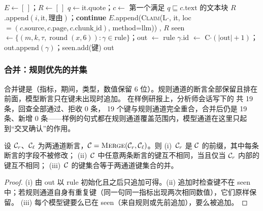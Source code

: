 \begin{algorithm}[t]
\caption{模型断言接入与两通道合并（ + ）}
\label{alg:rc-ingest}
\begin{algorithmic}[1]
  \State $E\gets[\,]$；$R\gets[\,]$
    \State $q\gets\text{it.quote}$；$c\gets$ 第一个满足 $q\sqsubseteq c.\text{text}$ 的文本块
      \State $R$.append$(i,\text{it},\text{理由})$；\textbf{continue}
    \EndIf
    \State $E$.append(\textsc{Claim}(L$\cdot$, it, loc $=(c.\text{source},c.\text{page},c.\text{chunk\_id})$, method=llm))
  \EndFor
  \State \Return {}, $R$
\EndFunction
{}
  \State seen $\gets\{(m,k,\tau,\operatorname{round}(x,6)) : \gamma\in\text{rule}\}$；out $\gets$ rule
      \State $\gamma$.id $\gets$ C$\cdot(|\text{out}|+1)$；out.append$(\gamma)$；seen.add(键)
    \EndIf
  \EndFor
  \State \Return out
\EndFunction
\end{algorithmic}
\end{algorithm}

\subsubsection{合并：规则优先的并集}

合并键是（指标，期间，类型，数值保留 6 位）。规则通道的断言全部保留且排在前面，模型断言只在键未出现时追加。
在样例研报上，分析师会话写下的  共 19 条，回查全部通过、拒收 0 条，
19 个键与规则通道完全重合，合并后仍是 19 条、新增 0 条——样例的句式都在规则通道覆盖范围内，模型通道在这里只起到“交叉确认”的作用。

\begin{proposition}[合并的性质]
\label{prop:rc-merge}
设 $\mathcal{C}_r$、$\mathcal{C}_\ell$ 为两通道断言，$\mathcal{C}=\textsc{Merge}(\mathcal{C}_r,\mathcal{C}_\ell)$。则
(i)~$\mathcal{C}_r$ 是 $\mathcal{C}$ 的前缀，其中每条断言的字段不被修改；
(ii)~$\mathcal{C}$ 中任意两条断言的键互不相同，当且仅当 $\mathcal{C}_r$ 内部的键互不相同；
(iii)~$\mathcal{C}$ 的键集合等于两通道键集合的并。
\end{proposition}
\begin{proof}
(i) 由 out 以 rule 初始化且之后只追加可得。(ii) 追加时检查键不在 seen 中；若规则通道自身有重复键（同一句同一指标出现两次相同数值），它们原样保留。
(iii) 每个模型键要么已在 seen（来自规则或先前追加），要么被追加。
\end{proof}

